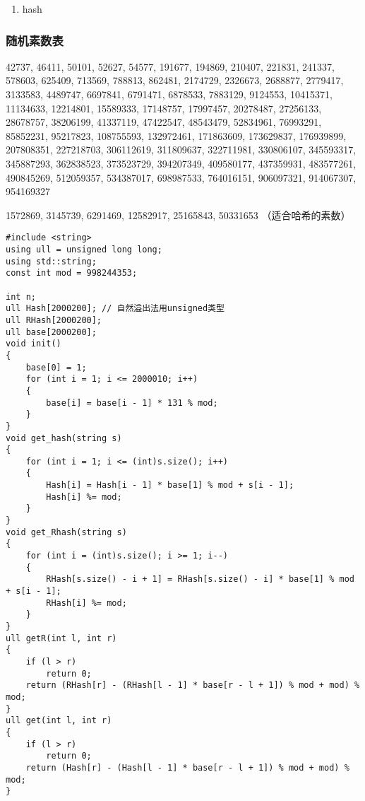 \documentclass[]{article}
\providecommand{\tightlist}{%
  \setlength{\itemsep}{0pt}\setlength{\parskip}{0pt}}
\begin{document}
\begin{enumerate}
\def\labelenumi{\arabic{enumi}.}
\setcounter{enumi}{2}
\tightlist
\item
  hash
\end{enumerate}

\hypertarget{ux968fux673aux7d20ux6570ux8868}{%
\subsubsection{随机素数表}\label{ux968fux673aux7d20ux6570ux8868}}

42737, 46411, 50101, 52627, 54577, 191677, 194869, 210407, 221831,
241337, 578603, 625409, 713569, 788813, 862481, 2174729, 2326673,
2688877, 2779417, 3133583, 4489747, 6697841, 6791471, 6878533, 7883129,
9124553, 10415371, 11134633, 12214801, 15589333, 17148757, 17997457,
20278487, 27256133, 28678757, 38206199, 41337119, 47422547, 48543479,
52834961, 76993291, 85852231, 95217823, 108755593, 132972461, 171863609,
173629837, 176939899, 207808351, 227218703, 306112619, 311809637,
322711981, 330806107, 345593317, 345887293, 362838523, 373523729,
394207349, 409580177, 437359931, 483577261, 490845269, 512059357,
534387017, 698987533, 764016151, 906097321, 914067307, 954169327

1572869, 3145739, 6291469, 12582917, 25165843, 50331653
（适合哈希的素数）

\begin{verbatim}
#include <string>
using ull = unsigned long long;
using std::string;
const int mod = 998244353;

int n;
ull Hash[2000200]; // 自然溢出法用unsigned类型
ull RHash[2000200];
ull base[2000200];
void init()
{
    base[0] = 1;
    for (int i = 1; i <= 2000010; i++)
    {
        base[i] = base[i - 1] * 131 % mod;
    }
}
void get_hash(string s)
{
    for (int i = 1; i <= (int)s.size(); i++)
    {
        Hash[i] = Hash[i - 1] * base[1] % mod + s[i - 1];
        Hash[i] %= mod;
    }
}
void get_Rhash(string s)
{
    for (int i = (int)s.size(); i >= 1; i--)
    {
        RHash[s.size() - i + 1] = RHash[s.size() - i] * base[1] % mod + s[i - 1];
        RHash[i] %= mod;
    }
}
ull getR(int l, int r)
{
    if (l > r)
        return 0;
    return (RHash[r] - (RHash[l - 1] * base[r - l + 1]) % mod + mod) % mod;
}
ull get(int l, int r)
{
    if (l > r)
        return 0;
    return (Hash[r] - (Hash[l - 1] * base[r - l + 1]) % mod + mod) % mod;
}
\end{verbatim}
\end{document}
